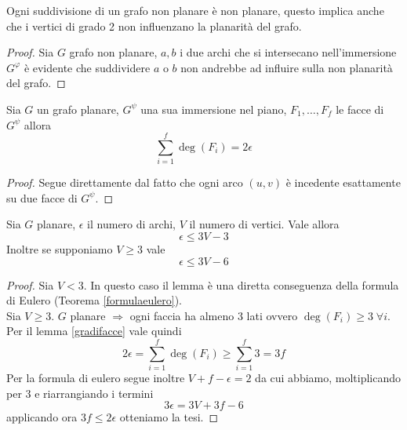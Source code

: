 \begin{proposizione}
    Ogni suddivisione di un grafo non planare è non planare, questo implica anche che i vertici di grado 2 non influenzano la planarità del grafo.
    \begin{proof}
        Sia \(G\) grafo non planare, \(a,b\) i due archi che si intersecano nell'immersione \(G^\varphi\) è evidente che suddividere \(a\) o \(b\) non andrebbe ad influire sulla non planarità del grafo.
    \end{proof}
\end{proposizione}

\begin{lemma}\label{gradifacce}
    Sia \(G\) un grafo planare, \(G^\psi\) una sua immersione nel piano, \(F_1, \dots, F_f\) le facce di \(G^\psi\) allora
    \begin{equation}
        \sum_{i=1}^f \deg(F_i) = 2\epsilon
    \end{equation}
    \begin{proof}
        Segue direttamente dal fatto che ogni arco \((u,v)\) è incedente esattamente su due facce di \(G^\psi\).
    \end{proof}
\end{lemma}

\begin{lemma}
    Sia \(G\) planare, \(\epsilon\) il numero di archi, \(V\) il numero di vertici. Vale allora
    \begin{equation}
        \epsilon \leq 3V - 3
    \end{equation}
    Inoltre se supponiamo \(V \geq 3\) vale
    \begin{equation}
        \epsilon \leq 3V - 6
    \end{equation}
    \begin{proof}
        Sia \(V<3\). In questo caso il lemma è una diretta conseguenza della formula di Eulero (Teorema {\ref{formulaeulero}}). \\
        Sia \(V\geq 3\). \(G\) planare \(\Rightarrow\) ogni faccia ha almeno 3 lati ovvero \(\deg(F_i) \geq 3\; \forall i\). Per il lemma {\ref{gradifacce}} vale quindi
        \begin{equation}
            2\epsilon = \sum_{i=1}^f \deg(F_i) \geq \sum_{i=1}^f 3 = 3f
        \end{equation}
        Per la formula di eulero segue inoltre \(V+f-\epsilon = 2\) da cui abbiamo, moltiplicando per 3 e riarrangiando i termini
        \begin{equation}
            3\epsilon = 3V + 3f - 6
        \end{equation}
        applicando ora \(3f\leq 2 \epsilon\) otteniamo la tesi.
    \end{proof}
\end{lemma}

